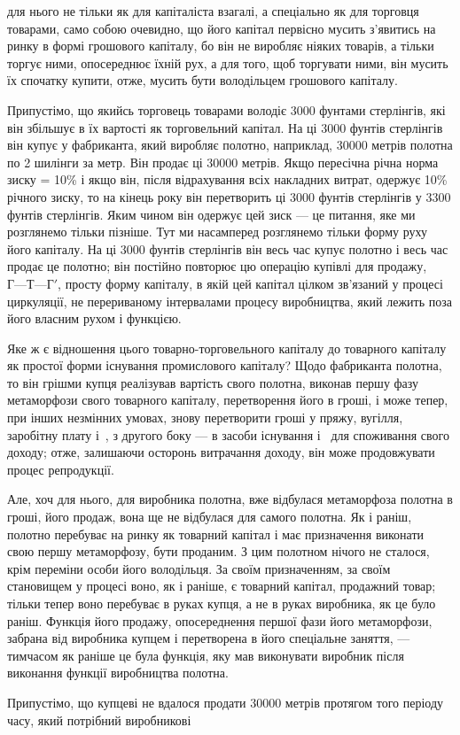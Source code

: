 \parcont{}  %
для нього не тільки як для капіталіста взагалі, а спеціально як
для торговця товарами, само собою очевидно, що його капітал
первісно мусить з’явитись на ринку в формі грошового капіталу,
бо він не виробляє ніяких товарів, а тільки торгує ними, опосереднює їхній рух, а для того, щоб
торгувати ними, він мусить
їх спочатку купити, отже, мусить бути володільцем грошового
капіталу.

Припустімо, що якийсь торговець товарами володіє 3000 фунтами стерлінгів, які він збільшує в їх
вартості як торговельний
капітал. На ці 3000 фунтів стерлінгів він купує у фабриканта,
який виробляє полотно, наприклад, 30000 метрів полотна по
2 шилінги за метр. Він продає ці 30000 метрів. Якщо пересічна
річна норма зиску = 10\% і якщо він, після відрахування всіх
накладних витрат, одержує 10\% річного зиску, то на кінець року
він перетворить ці 3000 фунтів стерлінгів у 3300 фунтів стерлінгів. Яким чином він одержує цей зиск
— це питання, яке ми
розглянемо тільки пізніше. Тут ми насамперед розглянемо тільки
форму руху його капіталу. На ці 3000 фунтів стерлінгів він
весь час купує полотно і весь час продає це полотно; він постійно повторює цю операцію купівлі для
продажу, $Г — Т — Г'$,
просту форму капіталу, в якій цей капітал цілком зв’язаний у процесі циркуляції, не перериваному
інтервалами процесу виробництва, який лежить поза його власним рухом і функцією.

Яке ж є відношення цього товарно-торговельного капіталу
до товарного капіталу як простої форми існування промислового
капіталу? Щодо фабриканта полотна, то він грішми купця реалізував вартість свого полотна, виконав
першу фазу метаморфози свого товарного капіталу, перетворення його в гроші, і може
тепер, при інших незмінних умовах, знову перетворити гроші
у пряжу, вугілля, заробітну плату і~, з другого боку — в засоби існування і~ для
споживання свого доходу; отже, залишаючи осторонь витрачання доходу, він може продовжувати процес
репродукції.

Але, хоч для нього, для виробника полотна, вже відбулася
метаморфоза полотна в гроші, його продаж, вона ще не відбулася для самого полотна. Як і раніш,
полотно перебуває на ринку
як товарний капітал і має призначення виконати свою першу
метаморфозу, бути проданим. З цим полотном нічого не сталося,
крім переміни особи його володільця. За своїм призначенням, за
своїм становищем у процесі воно, як і раніше, є товарний капітал, продажний товар; тільки тепер воно
перебуває в руках
купця, а не в руках виробника, як це було раніш. Функція його
продажу, опосереднення першої фази його метаморфози, забрана
від виробника купцем і перетворена в його спеціальне заняття, — тимчасом як раніше це була функція,
яку мав виконувати виробник після виконання функції виробництва полотна.

Припустімо, що купцеві не вдалося продати 30000 метрів
протягом того періоду часу, який потрібний виробникові
\parbreak{}  %
